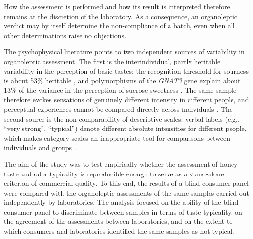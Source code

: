 How the assessment is performed and how its result is interpreted therefore
remains at the discretion of the laboratory. As a consequence, an organoleptic
verdict may by itself determine the non-compliance of a batch, even when all
other determinations raise no objections.


The psychophysical literature points to two independent sources of
variability in organoleptic assessment. The first is the interindividual,
partly heritable variability in the perception of basic tastes: the
recognition threshold for sourness is about 53\% heritable \cite{wise2007twin},
and polymorphisms of the \textit{GNAT3} gene explain about 13\% of the
variance in the perception of sucrose sweetness \cite{fushan2010sweet}. The
same sample therefore evokes sensations of genuinely different intensity in
different people, and perceptual experiences cannot be compared directly across
individuals \cite{bartoshuk2000comparing}. The second source is the
non-comparability of descriptive scales: verbal labels (e.g., ``very strong'',
``typical'') denote different absolute intensities for different people,
which makes category scales an inappropriate tool for comparisons between
individuals and groups \cite{bartoshuk2003labeled}.

The aim of the study was to test empirically whether the assessment of honey
taste and odor typicality is reproducible enough to serve as a stand-alone
criterion of commercial quality. To this end, the results of a blind consumer
panel were compared with the organoleptic assessments of the same samples
carried out independently by laboratories. The analysis focused on the ability
of the blind consumer panel to discriminate between samples in terms of taste
typicality, on the agreement of the assessments between laboratories, and on
the extent to which consumers and laboratories identified the same samples as
not typical.
